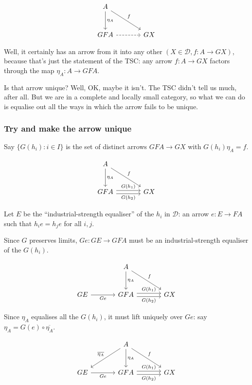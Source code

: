 \documentclass[11pt]{amsart}
\begin{document}
\[
\begin{tikzcd}[row sep=large, column sep=large]
A
    \arrow[dr, "f"]
    \arrow[d, "\eta_A"]
&
\\
GFA
    \arrow[r, dashrightarrow]
& GX
\end{tikzcd}
\]

Well, it certainly has an arrow from it into any other $(X \in \mathcal{D}, f: A \to GX)$, because that's just the statement of the TSC: any arrow $f: A \to GX$ factors through the map $\eta_A : A \to GFA$.

Is that arrow unique?
Well, OK, maybe it isn't. The TSC didn't tell us much, after all.
But we are in a complete and locally small category, so what we can do is equalise out all the ways in which the arrow fails to be unique.

\subsubsection{Try and make the arrow unique}
Say $\{ G(h_i): i \in I \}$ is the set of distinct arrows $GFA \to GX$ with $G(h_i) \eta_A = f$.

\[
\begin{tikzcd}[row sep=large, column sep=large]
A
    \arrow[dr, "f"]
    \arrow[d, "\eta_A"]
&
\\
GFA
    \arrow[r, shift left, "G(h_1)"]
    \arrow[r, shift right, "G(h_2)"']
& GX
\end{tikzcd}
\]

Let $E$ be the ``industrial-strength equaliser'' of the $h_i$ in $\mathcal{D}$: an arrow $e: E \to FA$ such that $h_i e = h_j e$ for all $i, j$.

Since $G$ preserves limits, $Ge: GE \to GFA$ must be an industrial-strength equaliser of the $G(h_i)$.

\[
\begin{tikzcd}[row sep=large, column sep=large]
& A
    \arrow[dr, "f"]
    \arrow[d, "\eta_A"]
&
\\
GE
    \arrow[r, "Ge"']
& GFA
    \arrow[r, shift left, "G(h_1)"]
    \arrow[r, shift right, "G(h_2)"']
& GX
\end{tikzcd}
\]

Since $\eta_A$ equalises all the $G(h_i)$, it must lift uniquely over $Ge$: say $\eta_A = G(e) \circ \overline{\eta_A}$.

\[
\begin{tikzcd}[row sep=large, column sep=large]
& A
    \arrow[dl, "\overline{\eta_A}"']
    \arrow[dr, "f"]
    \arrow[d, "\eta_A"]
&
\\
GE
    \arrow[r, "Ge"']
& GFA
    \arrow[r, shift left, "G(h_1)"]
    \arrow[r, shift right, "G(h_2)"']
& GX
\end{tikzcd}
\]
\end{document}
